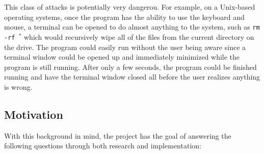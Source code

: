 \documentclass[pagenumbers]{ieee}
\begin{document}
This class of attacks is potentially very dangerou. For example, on a Unix-based operating systems, once the program has the ability to use the keyboard and mouse, a terminal can be opened to do almost anything to the system, such as \texttt{rm -rf $^{*}$} which would recursively wipe all of the files from the current directory on the drive. The program could easily run without the user being aware since a terminal window could be opened up and immediately minimized while the program is still running. After only a few seconds, the program could be finished running and have the terminal window closed all before the user realizes anything is wrong.


\subsection{Motivation}
\label{section:motivation}

With this background in mind, the project has the goal of answering the following questions through both research and implementation:
\end{document}

